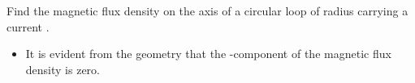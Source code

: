 \begin{ELexample}{}

Find the magnetic flux density on the axis of a circular loop of radius  carrying a current .


\begin{ELsolution}


\begin{itemize}
\tightlist
\item
  It is evident from the geometry that the -component of the magnetic flux density is zero.
\end{itemize}

\begin{ELimportant}{}


\end{ELimportant}

\end{ELsolution}

\end{ELexample}


